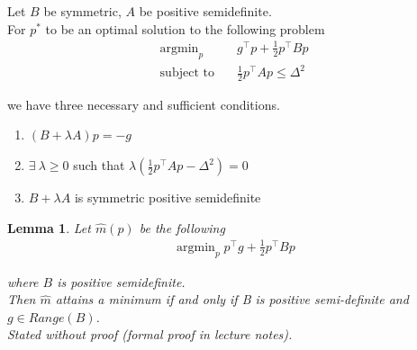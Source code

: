 \documentclass[a4paper]{article}
\DeclareMathOperator*{\argmin}{argmin}
\newtheorem{lemma}[theorem]{Lemma}
\begin{document}
Let $B$ be symmetric, $A$ be positive semidefinite. \\

For $p^*$ to be an optimal solution to the following problem
\begin{align*}
\argmin_p & \quad g^\intercal p + \frac{1}{2} p^\intercal B p \\
\text{subject to} & \quad \frac{1}{2} p^\intercal A p \leq \Delta^2
\end{align*}

we have three necessary and sufficient conditions.
\begin{enumerate}
\item $(B + \lambda A) p = -g$
\item $\exists\ \lambda \geq 0$ such that $\lambda (\frac{1}{2} p^\intercal A p - \Delta^2) = 0$
\item $B + \lambda A$ is symmetric positive semidefinite
\end{enumerate}

\begin{lemma} Let $\hat m(p)$ be the following
\begin{align*}
\argmin_p p^\intercal g + \frac{1}{2} p^\intercal B p
\end{align*}

where $B$ is positive semidefinite. \\

Then $\hat m$ attains a minimum if and only if B is positive semi-definite and $g \in Range(B)$. \\

Stated without proof (formal proof in lecture notes). \\

\end{lemma}
\end{document}

